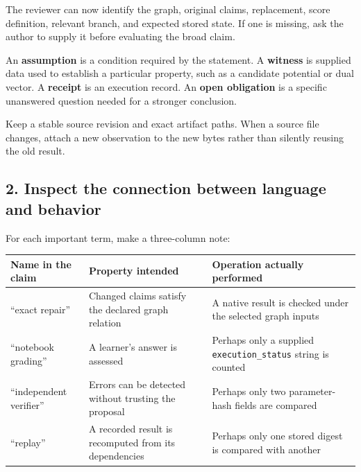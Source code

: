 \documentclass[
  11pt,
]{article}
\begin{document}
The reviewer can now identify the graph, original claims, replacement,
score definition, relevant branch, and expected stored state. If one is
missing, ask the author to supply it before evaluating the broad claim.

An \textbf{assumption} is a condition required by the statement. A
\textbf{witness} is supplied data used to establish a particular
property, such as a candidate potential or dual vector. A
\textbf{receipt} is an execution record. An \textbf{open obligation} is
a specific unanswered question needed for a stronger conclusion.

Keep a stable source revision and exact artifact paths. When a source
file changes, attach a new observation to the new bytes rather than
silently reusing the old result.

\subsection{2. Inspect the connection between language and
behavior}\label{inspect-the-connection-between-language-and-behavior}

For each important term, make a three-column note:

\begin{longtable}[]{@{}
  >{\raggedright\arraybackslash}p{}
  >{\raggedright\arraybackslash}p{}
  >{\raggedright\arraybackslash}p{}@{}}
\toprule\noalign{}
\begin{minipage}[b]{\linewidth}\raggedright
Name in the claim
\end{minipage} & \begin{minipage}[b]{\linewidth}\raggedright
Property intended
\end{minipage} & \begin{minipage}[b]{\linewidth}\raggedright
Operation actually performed
\end{minipage} \\
\midrule\noalign{}
\endhead
\bottomrule\noalign{}
\endlastfoot
``exact repair'' & Changed claims satisfy the declared graph relation &
A native result is checked under the selected graph inputs \\
``notebook grading'' & A learner's answer is assessed & Perhaps only a
supplied \nolinkurl{execution_status} string is counted \\
``independent verifier'' & Errors can be detected without trusting the
proposal & Perhaps only two parameter-hash fields are compared \\
``replay'' & A recorded result is recomputed from its dependencies &
Perhaps only one stored digest is compared with another \\
\end{longtable}
\end{document}
